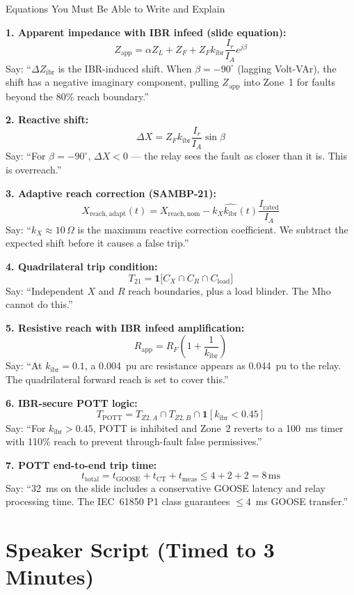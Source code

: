 \documentclass[12pt,a4paper]{article}
\newcommand{\kibr}{k_\mathrm{ibr}}
\newcommand{\Zapp}{Z_\mathrm{app}}
\newcommand{\DZibr}{\Delta Z_\mathrm{ibr}}
\begin{document}
\begin{formulabox}{Equations You Must Be Able to Write and Explain}

\textbf{1. Apparent impedance with IBR infeed (slide equation):}
\[
  \Zapp = \alpha Z_L + Z_F + Z_F \kibr \frac{I_r}{I_A} e^{j\beta}
\]
Say: ``$\DZibr$ is the IBR-induced shift. When $\beta = -90^\circ$ (lagging Volt-VAr), the shift has a negative imaginary component, pulling $\Zapp$ into Zone~1 for faults beyond the 80\% reach boundary.''

\textbf{2. Reactive shift:}
\[
  \Delta X = Z_F \kibr \frac{I_r}{I_A} \sin\beta
\]
Say: ``For $\beta = -90^\circ$, $\Delta X < 0$ --- the relay sees the fault as closer than it is. This is overreach.''

\textbf{3. Adaptive reach correction (SAMBP-21):}
\[
  X_\mathrm{reach,adapt}(t) = X_\mathrm{reach,nom} - k_X \hat{\kibr}(t) \frac{I_\mathrm{rated}}{I_A}
\]
Say: ``$k_X \approx 10\,\Omega$ is the maximum reactive correction coefficient. We subtract the expected shift before it causes a false trip.''

\textbf{4. Quadrilateral trip condition:}
\[
  T_{21} = \mathbf{1}\bigl[C_X \cap C_R \cap C_\mathrm{load}\bigr]
\]
Say: ``Independent $X$ and $R$ reach boundaries, plus a load blinder. The Mho cannot do this.''

\textbf{5. Resistive reach with IBR infeed amplification:}
\[
  R_\mathrm{app} = R_F \!\left(1 + \frac{1}{\kibr}\right)
\]
Say: ``At $\kibr = 0.1$, a 0.004~pu arc resistance appears as 0.044~pu to the relay. The quadrilateral forward reach is set to cover this.''

\textbf{6. IBR-secure POTT logic:}
\[
  T_\mathrm{POTT} = T_{Z2,A} \cap T_{Z2,B} \cap \mathbf{1}[\kibr < 0.45]
\]
Say: ``For $\kibr > 0.45$, POTT is inhibited and Zone~2 reverts to a 100~ms timer with 110\% reach to prevent through-fault false permissives.''

\textbf{7. POTT end-to-end trip time:}
\[
  t_\mathrm{total} = t_\mathrm{GOOSE} + t_\mathrm{CT} + t_\mathrm{meas} \leq 4 + 2 + 2 = 8\,\mathrm{ms}
\]
Say: ``32~ms on the slide includes a conservative GOOSE latency and relay processing time. The IEC~61850 P1 class guarantees $\leq 4$~ms GOOSE transfer.''
\end{formulabox}

\section{Speaker Script (Timed to 3 Minutes)}
\end{document}
